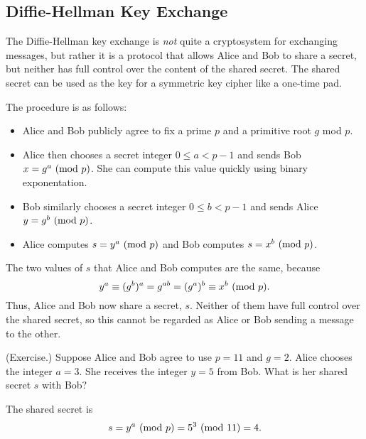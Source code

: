 \documentclass[letterpaper]{article}
\begin{document}
\subsection{Diffie-Hellman Key Exchange}
The Diffie-Hellman key exchange is \emph{not} quite a cryptosystem for exchanging messages, but rather it is a protocol that allows Alice and Bob to share a secret, but neither has full control over the content of the shared secret. The shared secret can be used as the key for a symmetric key cipher like a one-time pad. 

\bigskip 

The procedure is as follows:
\begin{itemize}
    \item Alice and Bob publicly agree to fix a prime $p$ and a primitive root $g$ mod $p$. 
    \item Alice then chooses a secret integer $0 \leq a < p - 1$ and sends Bob $x = g^a \ (\mathrm{mod}\ p)$. She can compute this value quickly using binary exponentation. 
    \item Bob similarly chooses a secret integer $0 \leq b < p - 1$ and sends Alice $y = g^b \ (\mathrm{mod}\ p)$. 
    \item Alice computes $s = y^a \ (\mathrm{mod}\ p)$ and Bob computes $s = x^b \ (\mathrm{mod}\ p)$.  
\end{itemize}
The two values of $s$ that Alice and Bob computes are the same, because
\[y^a \equiv (g^b)^a = g^{ab} = (g^a)^b \equiv x^b \ (\mathrm{mod}\ p).\]
Thus, Alice and Bob now share a secret, $s$. Neither of them have full control over the shared secret, so this cannot be regarded as Alice or Bob sending a message to the other.
\begin{mdframed}
    (Exercise.) Suppose Alice and Bob agree to use $p = 11$ and $g = 2$. Alice chooses the integer $a = 3$. She receives the integer $y = 5$ from Bob. What is her shared secret $s$ with Bob? 

    \begin{mdframed}
        The shared secret is \[s = y^a \ (\mathrm{mod}\ p) = 5^3 \ (\mathrm{mod}\ 11) = 4.\]
    \end{mdframed}
\end{mdframed}
\end{document}
